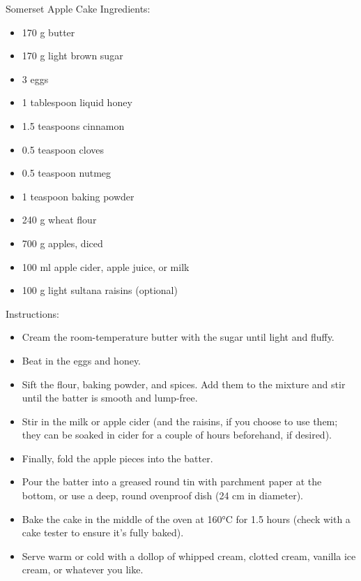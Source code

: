 \documentclass[12pt]{report}
\begin{document}
    \begin{myExamplex}{Somerset Apple Cake}{}
    Ingredients:
        \begin{itemize}\setlength\itemsep{-0.5em}
        \item 170 g butter
        \item 170 g light brown sugar 
        \item 3 eggs
        \item 1 tablespoon liquid honey
        \item 1.5 teaspoons cinnamon
        \item 0.5 teaspoon cloves
        \item 0.5 teaspoon nutmeg
        \item 1 teaspoon baking powder
        \item 240 g wheat flour
        \item 700 g apples, diced
        \item 100 ml apple cider, apple juice, or milk
        \item 100 g light sultana raisins (optional)
    \end{itemize}
    Instructions:
        \begin{itemize}\setlength\itemsep{-0.5em}
        \item Cream the room-temperature butter with the sugar until light and fluffy.
        \item Beat in the eggs and honey.
        \item Sift the flour, baking powder, and spices. Add them to the mixture and stir until the batter is smooth and lump-free.
        \item Stir in the milk or apple cider (and the raisins, if you choose to use them; they can be soaked in cider for a couple of hours beforehand, if desired).
        \item Finally, fold the apple pieces into the batter.
        \item Pour the batter into a greased round tin with parchment paper at the bottom, or use a deep, round ovenproof dish (24 cm in diameter).
        \item Bake the cake in the middle of the oven at 160°C for 1.5 hours (check with a cake tester to ensure it's fully baked).
        \item Serve warm or cold with a dollop of whipped cream, clotted cream, vanilla ice cream, or whatever you like.
    \end{itemize}
    \end{myExamplex}    
\end{document}
